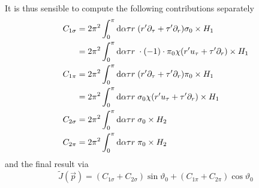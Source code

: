 It is thus sensible to compute the following contributions separately
\begin{subequations}
    \begin{align}
        C_{1\sigma} & =2\pi^2\int_0^\pi\text{d}\alpha\tau r\;(r^\prime\partial_\tau+\tau^\prime\partial_r)\sigma_0\times H_1            \\
                    & =2\pi^2\int_0^\pi\text{d}\alpha\tau r\;\cdot (-1)\cdot\pi_0\chi (r^\prime u_\tau+\tau^\prime\partial_r)\times H_1 \\
        C_{1\pi}    & =2\pi^2\int_0^\pi\text{d}\alpha\tau r\;(r^\prime\partial_\tau+\tau^\prime\partial_r)\pi_0\times H_1               \\
                    & =2\pi^2\int_0^\pi\text{d}\alpha\tau r\;\sigma_0\chi (r^\prime u_\tau+\tau^\prime\partial_r)\times H_1             \\
        C_{2\sigma} & =2\pi^2\int_0^\pi\text{d}\alpha\tau r\;\sigma_0\times H_2                                                         \\
        C_{2\pi}    & =2\pi^2\int_0^\pi\text{d}\alpha\tau r\;\pi_0\times H_2
    \end{align}
\end{subequations}
and the final result via
\begin{equation}
    \tilde{J}(\vec{p})=(C_{1\sigma}+C_{2\sigma})\sin\vartheta_0+(C_{1\pi}+C_{2\pi})\cos\vartheta_0
\end{equation}

